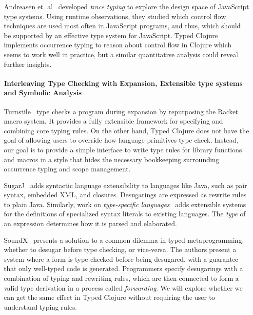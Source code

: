 \documentclass[9pt]{extarticle}
\begin{document}
Andreasen et. al~\cite{Andreasen2016TraceTA} developed
\emph{trace typing} to explore the design space of JavaScript type systems. 
Using runtime observations, they studied which control flow techniques
are used most often in JavaScript programs, and thus, which should
be supported by an effective type system for JavaScript.
Typed Clojure implements occurrence typing to reason about control
flow in Clojure which seems to work well in practice, but a similar
quantitative analysis could reveal further insights.



\paragraph{Interleaving Type Checking with Expansion, Extensible type systems and Symbolic Analysis}

Turnstile~\cite{Chang2017TSM} type checks a program during expansion
by repurposing the Racket macro system. It provides a fully extensible framework
for specifying and combining core typing rules.
On the other hand, Typed Clojure does not have the goal of allowing users to override
how language primitives type check. Instead, our goal is to provide
a simple interface to write type rules for library functions and macros
in a style that hides the necessary bookkeeping surrounding occurrence
typing and scope management.

SugarJ~\cite{Erdweg2011SJ}
adds syntactic language extensibility to languages like Java, such as pair
syntax, embedded XML, and closures.
Desugarings are expressed as rewrite rules to plain Java.
Similarly, work on \emph{type-specific languages}~\cite{omar2014safely}
adds extensible systems for the definitions of specialized syntax literals
to existing languages.
The \emph{type} of an expression determines how it is parsed and elaborated.

SoundX~\cite{Lorenzen2016STS} presents a solution to a common
dilemma in typed metaprogramming: whether to desugar before
type checking, or vice-versa.
The authors present a system where a form is type checked before 
being desugared, with a guarantee that only well-typed code is generated.
Programmers specify desugarings with a combination of typing and rewriting rules, 
which are then connected to form a valid type derivation
in a process called \emph{forwarding}.
We will explore whether we can get the same effect in Typed Clojure
without requiring the user to understand typing rules.
\end{document}
